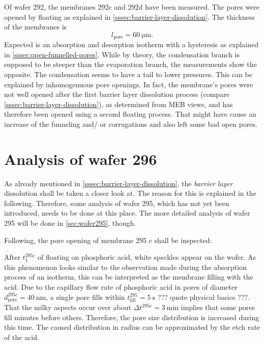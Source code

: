 \documentclass[thesis.tex]{subfiles}
\begin{document}
        Of wafer 292, the membranes 292c and 292d have been measured. The pores were opened by floating as explained in \cref{sssec:barrier-layer-dissolution}. The thickness of the membranes is
        \begin{equation}
            l_\mathrm{pore}=\SI{60}{\micro\meter}.
        \end{equation}
        Expected is an absorption and desorption isotherm with a hysteresis as explained in \cref{sssec:open-funnelled-pores}.
        While by theory, the condensation branch is supposed to be steeper than the evaporation branch, the measurements show the opposite.
        The condensation seems to have a tail to lower pressures. This can be explained by inhomogenuous pore openings. In fact, the membrane's
        pores were not well opened after the first barrier layer dissolution process (compare \cref{sssec:barrier-layer-dissolution}), as determined
        from MEB views, and has therefore been opened using a second floating process. That might have cause an increase of the funneling and/ or
        corrugations and also left some bad open pores.


    \section{Analysis of wafer 296}
    \label{sec:wafer296}

      As already mentioned in \cref{sssec:barrier-layer-dissolution}, the \textit{barrier layer} dissolution shall be taken a closer look at. The reason for this is explained in the following. Therefore, some analysis of wafer 295, which has not yet been introduced, needs to be done at this place. The more detailed analysis of wafer 295 will be done in \cref{sec:wafer295}, though.
      \medskip

      Following, the pore opening of membrane 295 c shall be inspected:

      After $t_1^{295c}$ of floating on phosphoric acid, white speckles appear on the wafer. As this phenomenon looks similar to the observation made during the absorption process of an isotherm, this can be interpreted as the membrane filling with the acid. Due to the capillary flow rate of phosphoric acid in pores of diameter $d_\mathrm{pore}^{295c}=\SI{40}{\nano\meter}$, a single pore fills within $t_\mathrm{fill}^{295}=\SI{5}{\second}$ ??? quote physical basics ???. That the milky aspects occur over about $\Delta t^{295c} = \SI{3}{\minute}$ implies that some pores fill minutes before others. Therefore, the pore size distribution is increased during this time. The caused distribution in radius can be approximated by the etch rate of the acid.
\end{document}
